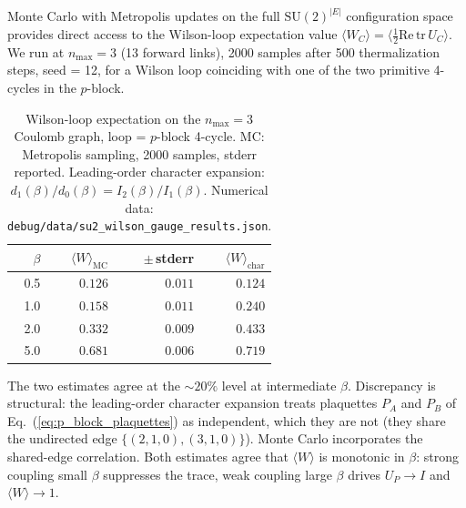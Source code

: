 \documentclass[11pt]{article}
\begin{document}
Monte Carlo with Metropolis updates on the full
$\mathrm{SU}(2)^{|E|}$ configuration space provides direct access to
the Wilson-loop expectation value $\langle W_C \rangle = \bigl\langle
\tfrac{1}{2}\mathrm{Re}\,\mathrm{tr}\,U_C \bigr\rangle$.  We run at
$n_{\max} = 3$ (13 forward links), 2000 samples after 500 thermalization
steps, seed = 12, for a Wilson loop coinciding with one of the two
primitive 4-cycles in the $p$-block.

\begin{table}[h]
\centering
\caption{Wilson-loop expectation on the $n_{\max} = 3$ Coulomb graph,
loop = $p$-block 4-cycle.  MC: Metropolis sampling, 2000 samples,
stderr reported.  Leading-order character expansion:
$d_1(\beta) / d_0(\beta) = I_2(\beta) / I_1(\beta)$.  Numerical data:
\texttt{debug/data/su2\_wilson\_gauge\_results.json}.}
\label{tab:wilson_loop}
\begin{tabular}{rrrr}
\toprule
$\beta$ & $\langle W \rangle_{\mathrm{MC}}$ & $\pm\,$stderr & $\langle W \rangle_{\text{char}}$ \\
\midrule
0.5 & $0.126$ & $0.011$ & $0.124$ \\
1.0 & $0.158$ & $0.011$ & $0.240$ \\
2.0 & $0.332$ & $0.009$ & $0.433$ \\
5.0 & $0.681$ & $0.006$ & $0.719$ \\
\bottomrule
\end{tabular}
\end{table}

The two estimates agree at the $\sim 20\%$ level at intermediate
$\beta$.  Discrepancy is structural: the leading-order character
expansion treats plaquettes $P_A$ and $P_B$ of
Eq.~(\ref{eq:p_block_plaquettes}) as independent, which they are not
(they share the undirected edge $\{(2,1,0), (3,1,0)\}$).  Monte Carlo
incorporates the shared-edge correlation.  Both estimates agree that
$\langle W \rangle$ is monotonic in $\beta$: strong coupling small
$\beta$ suppresses the trace, weak coupling large $\beta$ drives
$U_P \to I$ and $\langle W \rangle \to 1$.
\end{document}
